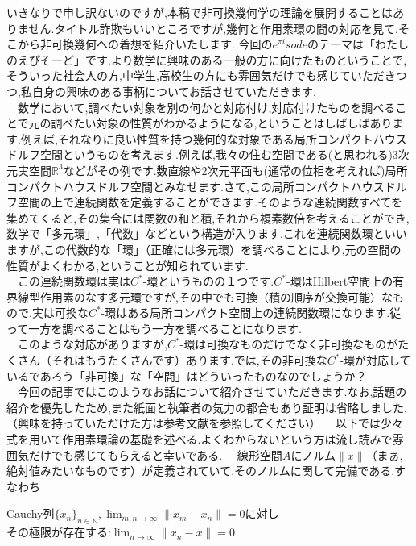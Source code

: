 いきなりで申し訳ないのですが,本稿で非可換幾何学の理論を展開することはありません.タイトル詐欺もいいところですが,幾何と作用素環の間の対応を見て,そこから非可換幾何への着想を紹介いたします.
今回の$e^{\pi i}sode$のテーマは「わたしのえぴそーど」です.より数学に興味のある一般の方に向けたものということで,そういった社会人の方,中学生,高校生の方にも雰囲気だけでも感じていただきつつ,私自身の興味のある事柄についてお話させていただきます.\\
　数学において,調べたい対象を別の何かと対応付け,対応付けたものを調べることで元の調べたい対象の性質がわかるようになる,ということはしばしばあります.例えば,それなりに良い性質を持つ幾何的な対象である局所コンパクトハウスドルフ空間というものを考えます.例えば,我々の住む空間である(と思われる)3次元実空間$\mathbb{R}^3$などがその例です.数直線や2次元平面も(通常の位相を考えれば)局所コンパクトハウスドルフ空間とみなせます.さて,この局所コンパクトハウスドルフ空間の上で連続関数を定義することができます.そのような連続関数すべてを集めてくると,その集合には関数の和と積,それから複素数倍を考えることができ,数学で「多元環」,「代数」などという構造が入ります.これを連続関数環といいますが,この代数的な「環」（正確には多元環）を調べることにより,元の空間の性質がよくわかる,ということが知られています.\\
　この連続関数環は実は$C^*$-環というものの１つです.$C^*$-環はHilbert空間上の有界線型作用素のなす多元環ですが,その中でも可換（積の順序が交換可能）なもので,実は可換な$C^*$-環はある局所コンパクト空間上の連続関数環になります.従って一方を調べることはもう一方を調べることになります.\\
　このような対応がありますが,$C^*$-環は可換なものだけでなく非可換なものがたくさん（それはもうたくさんです）あります.では,その非可換な$C^*$-環が対応しているであろう「非可換」な「空間」はどういったものなのでしょうか？\\
　今回の記事ではこのようなお話について紹介させていただきます.なお,話題の紹介を優先したため,また紙面と執筆者の気力の都合もあり証明は省略しました.（興味を持っていただけた方は参考文献を参照してください）
　以下では少々式を用いて作用素環論の基礎を述べる.よくわからないという方は流し読みで雰囲気だけでも感じてもらえると幸いである.
　線形空間$A$にノルム$\parallel x\parallel$（まぁ,絶対値みたいなものです）が定義されていて,そのノルムに関して完備である,すなわち
\begin{center}
Cauchy列$\{ x_n\}_{n \in \mathbb{N}},\lim_{m,n \rightarrow \infty}\parallel x_m-x_n\parallel =0$に対し\\
その極限が存在する:$\lim_{n\rightarrow \infty}\parallel x_n-x\parallel=0$
\end{center}
